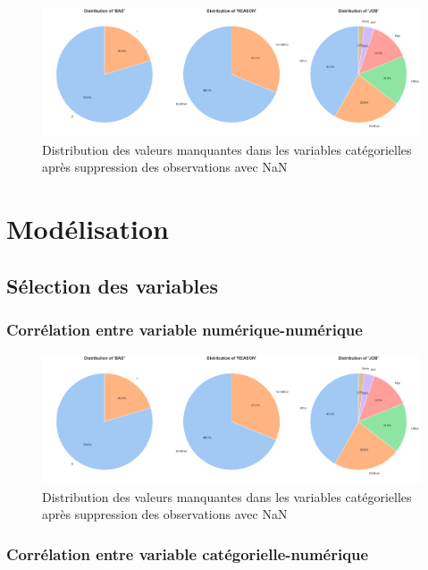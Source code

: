 \documentclass[a4paper,12pt]{report}
\begin{document}
\begin{figure}[h!]
  \includegraphics[width=\textwidth]{piechart_valeurs_manquantes_var_categorial_dropna.png}
  \caption{Distribution des valeurs manquantes dans les variables catégorielles après suppression des observations avec NaN}
  \label{fig:dist_missing_values_cat_dropna}
\end{figure}


\chapter{Modélisation}

\section{Sélection des variables}

\subsection{Corrélation entre variable numérique-numérique}

\begin{figure}[h!]
  \includegraphics[width=\textwidth]{piechart_valeurs_manquantes_var_categorial_dropna.png}
  \caption{Distribution des valeurs manquantes dans les variables catégorielles après suppression des observations avec NaN}
  \label{fig:}
\end{figure}

\subsection{Corrélation entre variable catégorielle-numérique}
\end{document}
